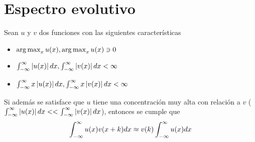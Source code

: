 
\chapter{Espectro evolutivo}

\begin{proposicion}
Sean $u$ y $v$ dos funciones con las siguientes características
\begin{itemize}
\item $\operatorname{arg\,max}_x u(x), \operatorname{arg\,max}_x u(x) \ni 0$
\item $\int_{-\infty}^{\infty} \left| u(x) \right| dx, \int_{-\infty}^{\infty} \left| v(x) \right| dx < \infty$
\item $\int_{-\infty}^{\infty} x\left| u(x) \right| dx, \int_{-\infty}^{\infty} x\left| v(x) \right| dx < \infty$
\end{itemize} 
Si además se satisface que $u$ tiene una {concentración} muy alta con relación a $v$
($ \int_{-\infty}^{\infty} \left| u(x) \right| dx << \int_{-\infty}^{\infty} \left| v(x) \right| dx $),
entonces se cumple que
\begin{equation*}
\int_{-\infty}^{\infty} u(x) v(x+k) dx \approx v(k) \int_{-\infty}^{\infty} u(x) dx
\end{equation*}
\label{pseudo_d}
\end{proposicion}





